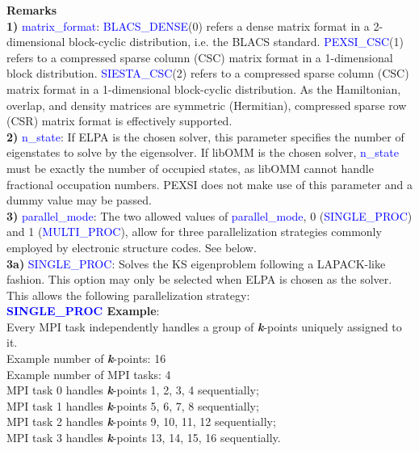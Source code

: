 \documentclass{report}
\begin{document}
\bigskip
\textbf{Remarks}\\

\textbf{1)} \textcolor{blue}{matrix\_format}:  \textcolor{blue}{BLACS\_DENSE}(0) refers a dense matrix format in a 2-dimensional block-cyclic distribution, i.e. the BLACS standard.  \textcolor{blue}{PEXSI\_CSC}(1) refers to a compressed sparse column (CSC) matrix format in a 1-dimensional block distribution.  \textcolor{blue}{SIESTA\_CSC}(2) refers to a compressed sparse column (CSC) matrix format in a 1-dimensional block-cyclic distribution.  As the Hamiltonian, overlap, and density matrices are symmetric (Hermitian), compressed sparse row (CSR) matrix format is effectively supported.\\

\textbf{2)} \textcolor{blue}{n\_state}:  If ELPA is the chosen solver, this parameter specifies the number of eigenstates to solve by the eigensolver.  If libOMM is the chosen solver, \textcolor{blue}{n\_state} must be exactly the number of occupied states, as libOMM cannot handle fractional occupation numbers\cite{libomm_corsetti_2014}.  PEXSI does not make use of this parameter and a dummy value may be passed.\\

\textbf{3)} \textcolor{blue}{parallel\_mode}:  The two allowed values of \textcolor{blue}{parallel\_mode}, 0 (\textcolor{blue}{SINGLE\_PROC}) and 1 (\textcolor{blue}{MULTI\_PROC}), allow for three parallelization strategies commonly employed by electronic structure codes.  See below.\\

\textbf{3a)} \textcolor{blue}{SINGLE\_PROC}:  Solves the KS eigenproblem following a LAPACK-like fashion.  This option may only be selected when ELPA is chosen as the solver.  This allows the following parallelization strategy:\\

\textbf{\textcolor{blue}{SINGLE\_PROC} Example}:\\

Every MPI task independently handles a group of \textbf{\textit{k}}-points uniquely assigned to it.\\

Example number of \textbf{\textit{k}}-points:  16\\
Example number of MPI tasks:  4\\

MPI task 0 handles \textbf{\textit{k}}-points  1,  2,  3,  4 sequentially;\\
MPI task 1 handles \textbf{\textit{k}}-points  5,  6,  7,  8 sequentially;\\
MPI task 2 handles \textbf{\textit{k}}-points  9, 10, 11, 12 sequentially;\\
MPI task 3 handles \textbf{\textit{k}}-points 13, 14, 15, 16 sequentially.\\
\end{document}
